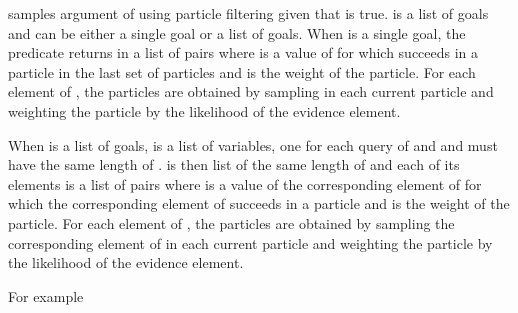 \documentclass[letterpaper,10pt,english]{sphinxmanual}
\begin{document}
\sphinxAtStartPar
samples argument  of  using particle filtering given that  is true.  is a list of goals and  can be either a single goal or a list of goals.
When  is a single goal, the predicate returns in  a list of pairs  where  is a value of  for which  succeeds in a particle in the last set of particles and  is the weight of the particle.
For each element of , the particles are obtained by sampling  in each current particle and weighting the particle by the likelihood of the evidence element.

\sphinxAtStartPar
When  is a list of goals,  is a list of variables, one for each query of  and  and  must have the same length of .
 is then list of the same length of  and each of its elements is a list of pairs  where  is a value of the corresponding element of  for which the corresponding element of  succeeds in a particle and  is the weight of the particle.
For each element of , the particles are obtained by sampling the corresponding element of  in each current particle and weighting the particle by the likelihood of the evidence element.

\sphinxAtStartPar
For example
\end{document}
